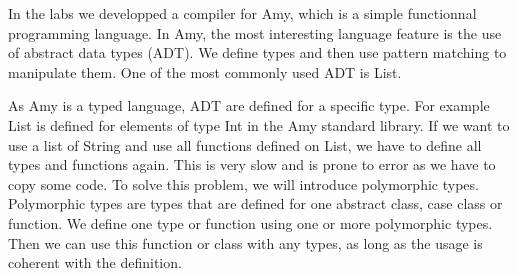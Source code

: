 In the labs we developped a compiler for Amy, which is a simple functionnal programming language. In Amy, the most interesting language feature is the use of abstract data types (ADT). We define types and then use pattern matching to manipulate them. One of the most commonly used ADT is List. 

As Amy is a typed language, ADT are defined for a specific type. For example List is defined for elements of type Int in the Amy standard library. If we want to use a list of String and use all functions defined on List, we have to define all types and functions again. This is very slow and is prone to error as we have to copy some code. To solve this problem, we will introduce polymorphic types. Polymorphic types are types that are defined for one abstract class, case class or function. We define one type or function using one or more polymorphic types. Then we can use this function or class with any types, as long as the usage is coherent with the definition.
